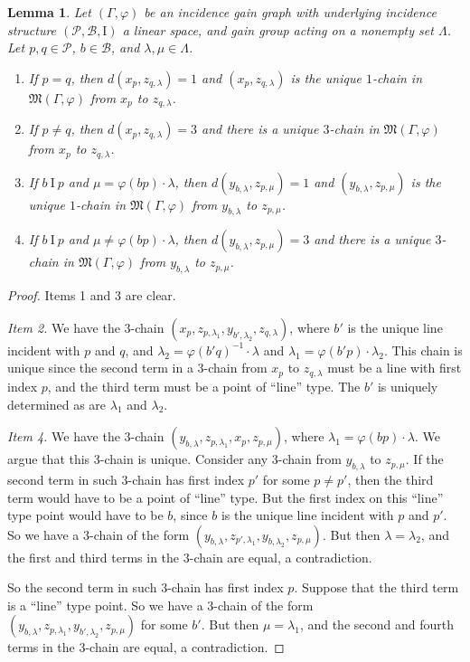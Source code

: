 \documentclass[11pt]{article}
\newtheorem{lemma}[theorem]{Lemma}
\theoremstyle{definition}
\begin{document}
\begin{lemma}
Let $(\Gamma,\varphi)$ be an incidence gain graph with underlying incidence structure $(\mathscr{P},\mathscr{B},\mathrm{I})$ a linear space, and gain group acting on a nonempty set $\Lambda$.  Let $p,q \in \mathscr{P}$, $b \in \mathscr{B}$, and $\lambda, \mu \in \Lambda$.  
\begin{enumerate}
\item If $p=q$, then $d(x_p,z_{q,\lambda}) = 1$ and $(x_p,z_{q,\lambda})$ is the unique $1$-chain in $\mathfrak{M}(\Gamma,\varphi)$ from $x_p$ to $z_{q,\lambda}$.
\item If $p\neq q$, then $d(x_p,z_{q,\lambda}) = 3$ and there is a unique $3$-chain in $\mathfrak{M}(\Gamma,\varphi)$ from $x_p$ to $z_{q,\lambda}$.
\item If $b \  \mathrm{I} \  p$ and $\mu = \varphi(bp) \cdot \lambda$, then $d(y_{b,\lambda},z_{p,\mu}) = 1$ and $(y_{b,\lambda},z_{p,\mu})$ is the unique $1$-chain in $\mathfrak{M}(\Gamma,\varphi)$ from $y_{b,\lambda}$ to $z_{p,\mu}$.
\item If $b \  \mathrm{I} \  p$ and $\mu \neq \varphi(bp) \cdot \lambda$, then $d(y_{b,\lambda},z_{p,\mu}) = 3$ and there is a unique $3$-chain in $\mathfrak{M}(\Gamma,\varphi)$ from $y_{b,\lambda}$ to $z_{p,\mu}$.
\end{enumerate}
\end{lemma}

\begin{proof}
Items 1 and 3 are clear.

\textit{Item 2.}  We have the $3$-chain $(x_p, z_{p,\lambda_1}, y_{b',\lambda_2}, z_{q,\lambda})$, where $b'$ is the unique line incident with $p$ and $q$, and $\lambda_2 = \varphi(b'q)^{-1} \cdot \lambda$ and $\lambda_1 = \varphi(b'p) \cdot \lambda_2$.  This chain is unique since the second term in a $3$-chain from $x_p$ to $z_{q,\lambda}$ must be a line with first index $p$, and the third term must be a point of ``line'' type.  The $b'$ is uniquely determined as are $\lambda_1$ and $\lambda_2$.

\textit{Item 4.}  We have the $3$-chain $(y_{b,\lambda}, z_{p,\lambda_1}, x_p, z_{p,\mu})$, where $\lambda_1 = \varphi(bp) \cdot \lambda$.  We argue that this $3$-chain is unique.  Consider any $3$-chain from $y_{b,\lambda}$ to $z_{p,\mu}$.  If the second term in such $3$-chain has first index $p'$ for some $p \neq p'$, then the third term would have to be a point of ``line'' type.  But the first index on this ``line'' type point would have to be $b$, since $b$ is the unique line incident with $p$ and $p'$.  So we have a $3$-chain of the form $(y_{b,\lambda}, z_{p',\lambda_1}, y_{b,\lambda_2}, z_{p,\mu})$.  But then $\lambda = \lambda_2$, and the first and third terms in the $3$-chain are equal, a contradiction.

So the second term in such $3$-chain has first index $p$.  Suppose that the third term is a ``line'' type point.  So we have a $3$-chain of the form \\ $(y_{b,\lambda}, z_{p,\lambda_1}, y_{b',\lambda_2}, z_{p,\mu})$ for some $b'$.  But then $\mu = \lambda_1$, and the second and fourth terms in the $3$-chain are equal, a contradiction.
\end{proof}
\end{document}
